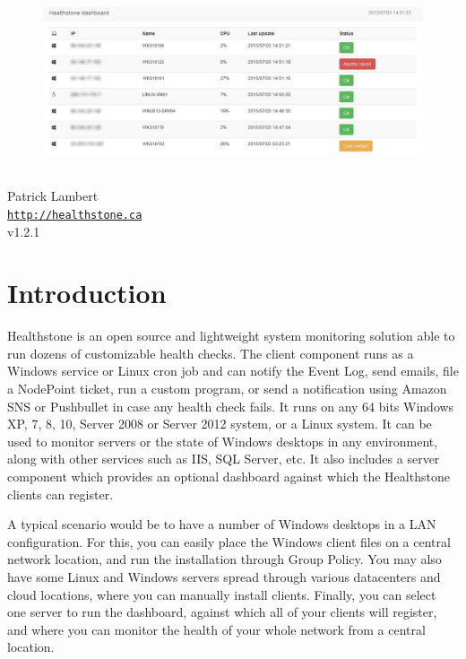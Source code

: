 \documentclass[11pt]{article}
\begin{document}
\begin{titlepage}
\bigskip
\begin{center}
\begin{figure}
\includegraphics[scale=0.6]{splash.jpg}
\end{figure}
\vspace*{1cm}
{
{\Huge \color{headings}{Healthstone Monitoring System}}\\
\bigskip
{\Large Patrick Lambert}\\
\texttt{\url{http://healthstone.ca}}\\
\bigskip
v1.2.1}
\vspace*{\fill}
\end{center}
\end{titlepage}

\tableofcontents

\newpage

\section{Introduction}

Healthstone is an open source and lightweight system monitoring solution able to run dozens of customizable health checks. The client component runs as a Windows service or Linux cron job and can notify the Event Log, send emails, file a NodePoint ticket, run a custom program, or send a notification using Amazon SNS or Pushbullet in case any health check fails. It runs on any 64 bits Windows XP, 7, 8, 10, Server 2008 or Server 2012 system, or a Linux system. It can be used to monitor servers or the state of Windows desktops in any environment, along with other services such as IIS, SQL Server, etc. It also includes a server component which provides an optional dashboard against which the Healthstone clients can register.

A typical scenario would be to have a number of Windows desktops in a LAN configuration. For this, you can easily place the Windows client files on a central network location, and run the installation through Group Policy. You may also have some Linux and Windows servers spread through various datacenters and cloud locations, where you can manually install clients. Finally, you can select one server to run the dashboard, against which all of your clients will register, and where you can monitor the health of your whole network from a central location.
\end{document}
